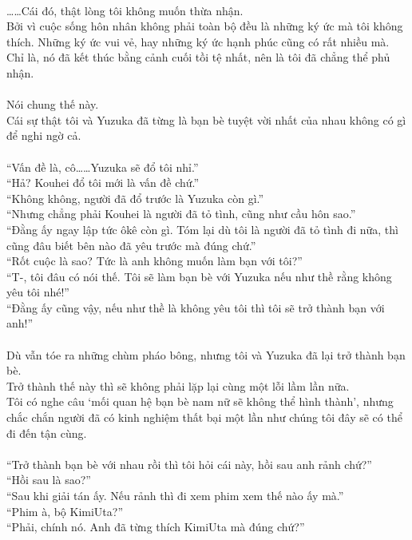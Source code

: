 \documentclass[12pt,a4paper, twosides]{book}
\begin{document}
\\
……Cái đó, thật lòng tôi không muốn thừa nhận.\\
Bởi vì cuộc sống hôn nhân không phải toàn bộ đều là những ký ức mà tôi không thích. Những ký ức vui vẻ, hay những ký ức hạnh phúc cũng có rất nhiều mà.\\
Chỉ là, nó đã kết thúc bằng cảnh cuối tồi tệ nhất, nên là tôi đã chẳng thể phủ nhận.\\
\\
Nói chung thế này.\\
Cái sự thật tôi và Yuzuka đã từng là bạn bè tuyệt vời nhất của nhau không có gì để nghi ngờ cả.\\
\\
“Vấn đề là, cô……Yuzuka sẽ đổ tôi nhỉ.”\\
“Hả? Kouhei đổ tôi mới là vấn đề chứ.”\\
“Không không, người đã đổ trước là Yuzuka còn gì.”\\
“Nhưng chẳng phải Kouhei là người đã tỏ tình, cũng như cầu hôn sao.”\\
“Đằng ấy ngay lập tức ôkê còn gì. Tóm lại dù tôi là người đã tỏ tình đi nữa, thì cũng đâu biết bên nào đã yêu trước mà đúng chứ.”\\
“Rốt cuộc là sao? Tức là anh không muốn làm bạn với tôi?”\\
“T-, tôi đâu có nói thế. Tôi sẽ làm bạn bè với Yuzuka nếu như thề rằng không yêu tôi nhé!”\\
“Đằng ấy cũng vậy, nếu như thề là không yêu tôi thì tôi sẽ trở thành bạn với anh!”\\
\\
Dù vẫn tóe ra những chùm pháo bông, nhưng tôi và Yuzuka đã lại trở thành bạn bè.\\
Trở thành thế này thì sẽ không phải lặp lại cùng một lỗi lầm lần nữa.\\
Tôi có nghe câu ‘mối quan hệ bạn bè nam nữ sẽ không thể hình thành’, nhưng chắc chắn người đã có kinh nghiệm thất bại một lần như chúng tôi đây sẽ có thể đi đến tận cùng.\\
\\
“Trở thành bạn bè với nhau rồi thì tôi hỏi cái này, hồi sau anh rảnh chứ?”\\
“Hồi sau là sao?”\\
“Sau khi giải tán ấy. Nếu rảnh thì đi xem phim xem thế nào ấy mà.”\\
“Phim à, bộ KimiUta?”\\
“Phải, chính nó. Anh đã từng thích KimiUta mà đúng chứ?”\\
\end{document}
